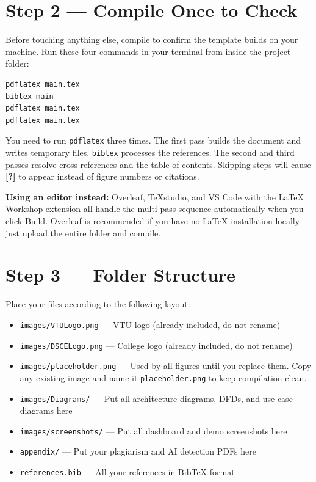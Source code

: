 \documentclass[12pt,a4paper]{report}
\begin{document}
\section{Step 2 — Compile Once to Check}

Before touching anything else, compile to confirm the template builds on your machine. Run these four commands in your terminal from inside the project folder:

\begin{lstlisting}[language=bash, caption={Full Compilation Sequence}]
pdflatex main.tex
bibtex main
pdflatex main.tex
pdflatex main.tex
\end{lstlisting}

You need to run \texttt{pdflatex} three times. The first pass builds the document and writes temporary files. \texttt{bibtex} processes the references. The second and third passes resolve cross-references and the table of contents. Skipping steps will cause \textbf{[?]} to appear instead of figure numbers or citations.

\textbf{Using an editor instead:} Overleaf, TeXstudio, and VS Code with the LaTeX Workshop extension all handle the multi-pass sequence automatically when you click Build. Overleaf is recommended if you have no LaTeX installation locally --- just upload the entire folder and compile.

\section{Step 3 — Folder Structure}

Place your files according to the following layout:

\begin{itemize}
    \item \texttt{images/VTULogo.png} --- VTU logo (already included, do not rename)
    \item \texttt{images/DSCELogo.png} --- College logo (already included, do not rename)
    \item \texttt{images/placeholder.png} --- Used by all figures until you replace them. Copy any existing image and name it \texttt{placeholder.png} to keep compilation clean.
    \item \texttt{images/Diagrams/} --- Put all architecture diagrams, DFDs, and use case diagrams here
    \item \texttt{images/screenshots/} --- Put all dashboard and demo screenshots here
    \item \texttt{appendix/} --- Put your plagiarism and AI detection PDFs here
    \item \texttt{references.bib} --- All your references in BibTeX format
\end{itemize}
\end{document}
